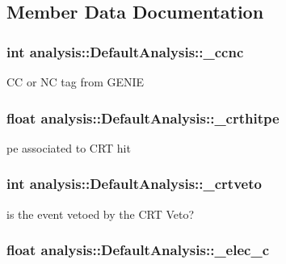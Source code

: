 \subsection{Member Data Documentation}
\hypertarget{classanalysis_1_1DefaultAnalysis_ac2df5c78c8d06e090d0b6cd195fa83d8}{
\subsubsection[{\-\_\-ccnc}]{\setlength{\rightskip}{0pt plus 5cm}int analysis\-::\-Default\-Analysis\-::\-\_\-ccnc\hspace{0.3cm}{\ttfamily [private]}}}\label{classanalysis_1_1DefaultAnalysis_ac2df5c78c8d06e090d0b6cd195fa83d8}
C\-C or N\-C tag from G\-E\-N\-I\-E \hypertarget{classanalysis_1_1DefaultAnalysis_a900ec35e3ca4a00d4625a1e632bb6b40}{
\subsubsection[{\-\_\-crthitpe}]{\setlength{\rightskip}{0pt plus 5cm}float analysis\-::\-Default\-Analysis\-::\-\_\-crthitpe\hspace{0.3cm}{\ttfamily [private]}}}\label{classanalysis_1_1DefaultAnalysis_a900ec35e3ca4a00d4625a1e632bb6b40}
pe associated to C\-R\-T hit \hypertarget{classanalysis_1_1DefaultAnalysis_a84ce9904fa527012a65c2be203a38d38}{
\subsubsection[{\-\_\-crtveto}]{\setlength{\rightskip}{0pt plus 5cm}int analysis\-::\-Default\-Analysis\-::\-\_\-crtveto\hspace{0.3cm}{\ttfamily [private]}}}\label{classanalysis_1_1DefaultAnalysis_a84ce9904fa527012a65c2be203a38d38}
is the event vetoed by the C\-R\-T Veto? \hypertarget{classanalysis_1_1DefaultAnalysis_a5ce51cfe745fbf0327541a1877a99f87}{
\subsubsection[{\-\_\-elec\-\_\-c}]{\setlength{\rightskip}{0pt plus 5cm}float analysis\-::\-Default\-Analysis\-::\-\_\-elec\-\_\-c\hspace{0.3cm}{\ttfamily [private]}}}\label{classanalysis_1_1DefaultAnalysis_a5ce51cfe745fbf0327541a1877a99f87}
